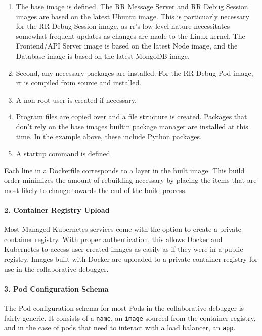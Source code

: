 \documentclass[12pt]{article}
\begin{document}
\begin{enumerate}
\item The base image is defined. The RR Message Server and RR Debug
  Session images are based on the latest Ubuntu image.  This is
  particuarly necessary for the RR Debug Session image, as rr's
  low-level nature necessitates somewhat frequent updates as changes
  are made to the Linux kernel.  The Frontend/API Server image is
  based on the latest Node image, and the Database image is based on
  the latest MongoDB image.
\item Second, any necessary packages are installed.  For the RR Debug
  Pod image, rr is compiled from source and installed.
\item A non-root user is created if necessary.
\item Program files are copied over and a file structure is created.
  Packages that don't rely on the base images builtin package manager
  are installed at this time.  In the example above, these include
  Python packages.
\item A startup command is defined.
\end{enumerate}

Each line in a Dockerfile corresponds to a layer in the built image.
This build order minimizes the amount of rebuilding necessary by
placing the items that are most likely to change towards the end of
the build process.

\paragraph{2. Container Registry Upload}

Most Managed Kubernetes services come with the option to create a
private container registry.  With proper authentication, this allows
Docker and Kubernetes to access user-created images as easily as if
they were in a public registry.  Images built with Docker are uploaded
to a private container registry for use in the collaborative debugger.

\paragraph{3. Pod Configuration Schema} \label{podschema}

The Pod configuration schema for most Pods in the collaborative
debugger is fairly generic.  It consists of a \lstinline{name}, an
\lstinline{image} sourced from the container registry, and in the case
of pods that need to interact with a load balancer, an
\lstinline{app}.
\end{document}
